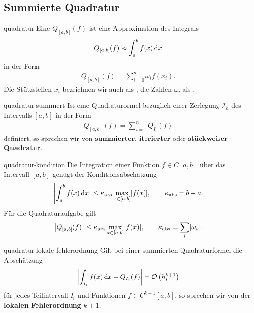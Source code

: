 \subsection{Summierte Quadratur}

\begin{Definition}{quadratur}
  Eine  $Q_{[a,b]}(f)$ ist eine Approximation
  des Integrals
  \begin{gather}
    Q_{[a,b]}(f) \approx \int_a^b f(x)\,\mathrm{d} x
  \end{gather}
  in der Form
  \begin{gather}
    Q_{[a,b]}(f) = \sum_{i=0}^n \omega_i f(x_i).
  \end{gather}
  Die Stützstellen $x_i$ bezeichnen wir auch als
  , die Zahlen $\omega_i$ als
  .
\end{Definition}

\begin{Definition}{quadratur-summiert}
  Ist eine Quadraturormel bezüglich einer Zerlegung
  $\mathcal I_h$ des Intervalls $[a,b]$ in der Form
  \begin{gather}
    Q_{[a,b]}(f) = \sum_{i=1}^n Q_{I_i} (f)
  \end{gather}
  definiert, so sprechen wir von \textbf{summierter},
  \textbf{iterierter} oder \textbf{stückweiser Quadratur}.
\end{Definition}

\begin{Satz}{quadratur-kondition}
  Die Integration einer Funktion $f\in C[a,b]$ über das Intervall $[a,b]$ genügt der Konditionsabschätzung
  \begin{gather}
    \left|\int_a^b f(x)\,\mathrm{d} x \right| \le \kappa_{\text{abs}} \max_{x\in[a,b]}\lvert f(x)\rvert,
    \qquad \kappa_{\text{abs}} = b-a.
  \end{gather}
  Für die Quadraturaufgabe gilt
  \begin{gather}
    \left| Q_{[a,b]}(f)\right| \le \kappa_{\text{abs}} \max_{x\in[a,b]}\lvert f(x)\rvert,
    \qquad \kappa_{\text{abs}} = \sum_i \lvert\omega_i\rvert.
  \end{gather}
\end{Satz}

\begin{Definition}{quadratur-lokale-fehlerordnung}
  Gilt bei einer summierten Quadraturformel die Abschätzung
  \begin{gather}
    \left|\int_{I_i} f(x)\,\mathrm{d} x - Q_{I_i}(f)\right|
    =\mathcal O\left(h_i^{k+1}\right)
  \end{gather}
  für jedes Teilintervall $I_i$ und Funktionen $f\in C^{k+1}[a,b]$, so
  sprechen wir von der \textbf{lokalen
    Fehlerordnung} $k+1$.
\end{Definition}

